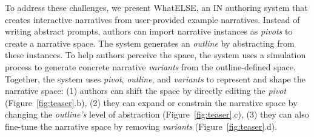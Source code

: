 {%

To address these challenges, we present {\sc WhatELSE}, an IN authoring system that creates interactive narratives from user-provided example narratives.  
Instead of writing abstract prompts, authors can import narrative instances as {\em pivots} to create a narrative space. The system generates an {\em outline} by abstracting from these instances. To help authors perceive the space, the system uses a simulation process to generate concrete narrative {\em variants} from the outline-defined space. Together, the system uses {\em pivot}, {\em outline}, and {\em variants} to represent and shape the narrative space: (1) authors can shift the space by directly editing the {\em pivot} (Figure~\ref{fig:teaser}.b), (2) they can expand or constrain the narrative space by changing the {\em outline's} level of abstraction (Figure~\ref{fig:teaser}.c), (3) they can also fine-tune the narrative space by removing {\em variants} (Figure~\ref{fig:teaser}.d). 


}
